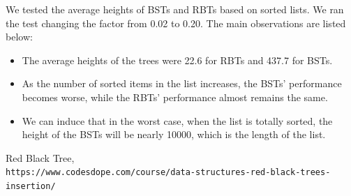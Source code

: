 \documentclass[12pt]{article}
\begin{document}
We tested the average heights of BSTs and RBTs based on sorted lists. We ran the test changing the factor from 0.02 to 0.20. The main observations are listed below:
\begin{itemize}
\item The average heights of the trees were 22.6 for RBTs and 437.7 for BSTs. 
\item As the number of sorted items in the list increases, the BSTs' performance becomes worse, while the RBTs' performance almost remains the same. 
\item We can induce that in the worst case, when the list is totally sorted, the height of the BSTs will be nearly 10000, which is the length of the list.
\end{itemize}



\begin{thebibliography}{9}
Red Black Tree,\\
\texttt{https://www.codesdope.com/course/data-structures-red-black-trees-insertion/}




\end{thebibliography}
\end{document}
